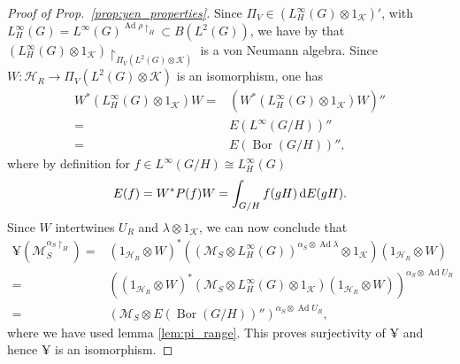 \documentclass[sn-mathphys-num]{sn-jnl}%
\newcommand{\HH}{\mathcal{H}}
\newcommand{\KK}{\mathcal{K}}
\newcommand{\MM}{\mathcal{M}}
\DeclareMathOperator{\Bor}{Bor}
\DeclareMathOperator{\Ad}{Ad}
\newcommand{\diff}{\textup{d}}
\numberwithin{equation}{section}
\theoremstyle{thmstyleone}%
\theoremstyle{thmstyletwo}%
\theoremstyle{thmstylethree}%
\begin{document}
\begin{proof}[Proof of Prop.\ \ref{prop:yen_properties}]
        Since $\Pi_V\in (L^\infty_H(G)\otimes 1_\KK)'$, with $L^\infty_H(G)=L^\infty(G)^{\Ad\rho\restriction_H}\subset B(L^2(G))$, we have by \cite[Prop.\ I.2.1]{dixmier1981VonNeumann} that $( L^\infty_H(G)\otimes 1_\KK)\restriction_{\Pi_V(
        L^2(G)\otimes\KK)}$ is a von Neumann algebra. Since $W:\HH_R\to \Pi_V(L^2(G)\otimes\KK)$ is an isomorphism, one has
        \begin{align}
            W^*(L^\infty_H(G)\otimes 1_\KK)W=&(W^*(L^\infty_H(G)\otimes 1_\KK)W)''\nonumber\\
            =&E(L^\infty(G/H))''\nonumber\\
            =&E(\Bor(G/H))'',
        \end{align}
        where by definition for $f\in L^\infty(G/H)\cong L^\infty_H(G)$
        \begin{equation}
            E(f)=W^*P(f)W=\int_{G/H} f(gH)\,\diff E(gH).
        \end{equation}
        Since $W$ intertwines $U_R$ and $\lambda\otimes 1_\KK$, we can now conclude that
        \begin{align}
            \yen(\MM_S^{\alpha_S\restriction_H})=&(1_{\HH_R}\otimes W)^*\left((\MM_S\otimes L^\infty_H(G))^{\alpha_S\otimes\Ad\lambda}\otimes 1_\KK\right)(1_{\HH_R}\otimes W)\nonumber\\=&
            \left((1_{\HH_R}\otimes W)^*(\MM_S\otimes L^\infty_H(G)\otimes 1_\KK)(1_{\HH_R}\otimes W)\right)^{\alpha_S\otimes\Ad U_R}\nonumber\\
            =&(\MM_S\otimes E(\Bor(G/H))'')^{\alpha_S\otimes \Ad U_R},
        \end{align}
        where we have used lemma \ref{lem:pi_range}. This proves surjectivity of $\yen$ and hence $\yen$ is an isomorphism.
    \end{proof}
\end{document}
